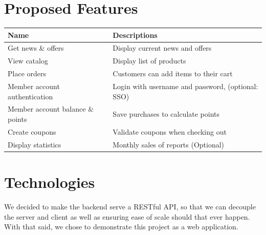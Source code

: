 \documentclass[a4paper]{article}
\numberwithin{equation}{section}
\begin{document}
\section{Proposed Features}
\begin{center}
  \begin{tabular}{*{2}{l}}
    \toprule
    Name                             & Descriptions                                      \\
    \midrule
    Get news \& offers               & Display current news and offers                   \\
    View catalog                     & Display list of products                          \\
    Place orders                     & Customers can add items to their cart             \\
    Member account authentication    & Login with username and password, (optional: SSO) \\
    Member account balance \& points & Save  purchases to calculate points               \\
    Create coupons                   & Validate coupons when checking out                \\
    Display statistics               & Monthly sales of reports (Optional)               \\
    \bottomrule
  \end{tabular}
\end{center}

\section{Technologies}


We decided to make the backend serve a RESTful API, so that we can decouple the server and client as well as ensuring ease of scale should that ever happen.
With that said, we chose to demonstrate this project as a web application.
\end{document}
